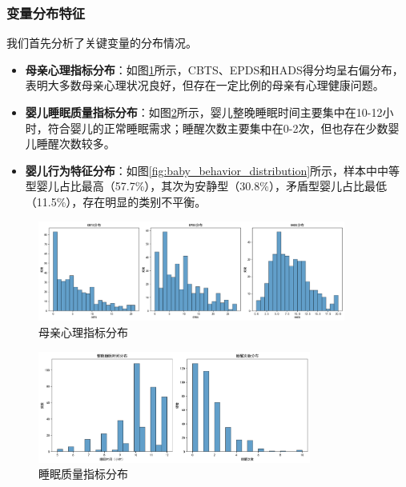 \documentclass[withoutpreface,bwprint]{cumcmthesis}
\begin{document}
\subsubsection{变量分布特征}
我们首先分析了关键变量的分布情况。
\begin{itemize}
    \item \textbf{母亲心理指标分布}：如图\ref{fig:psychological_indicators_distribution}所示，CBTS、EPDS和HADS得分均呈右偏分布，表明大多数母亲心理状况良好，但存在一定比例的母亲有心理健康问题。
    \item \textbf{婴儿睡眠质量指标分布}：如图\ref{fig:sleep_quality_distribution}所示，婴儿整晚睡眠时间主要集中在10-12小时，符合婴儿的正常睡眠需求；睡醒次数主要集中在0-2次，但也存在少数婴儿睡醒次数较多。
    \item \textbf{婴儿行为特征分布}：如图\ref{fig:baby_behavior_distribution}所示，样本中中等型婴儿占比最高（57.7\%），其次为安静型（30.8\%），矛盾型婴儿占比最低（11.5\%），存在明显的类别不平衡。
\end{itemize}

\begin{figure}[htbp]
    \centering
    \includegraphics[width=0.9\textwidth]{figures/psychological_indicators_distribution.png}
    \caption{母亲心理指标分布}
    \label{fig:psychological_indicators_distribution}
\end{figure}

\begin{figure}[htbp]
    \centering
    \includegraphics[width=0.8\textwidth]{figures/sleep_quality_distribution.png}
    \caption{睡眠质量指标分布}
    \label{fig:sleep_quality_distribution}
\end{figure}
\end{document}
